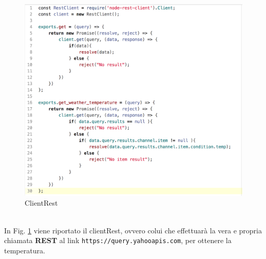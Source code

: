 \documentclass{llncs}
\begin{document}
\begin{figure}
    \centering
    \includegraphics[width=1\textwidth]{Immagini/Requisito2/clientRestReq2.png}
    \caption{ClientRest}
    \label{fig:ClientRestReq2}
\end{figure}
\vspace*{1ex}
\\
In Fig. \hyperref[fig:ClientRestReq2]{\ref{fig:ClientRestReq2}} viene riportato il clientRest, ovvero colui che effettuar\`a la vera e propria chiamata \textbf{REST} al link \texttt{https://query.yahooapis.com}, per ottenere la temperatura.\\
\end{document}

